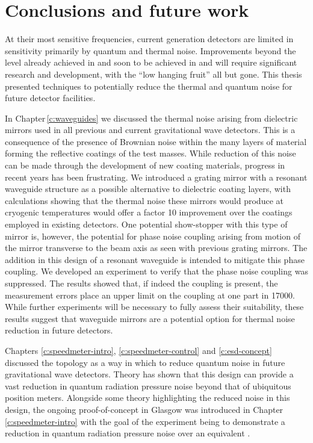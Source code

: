 \chapter{\label{c:conclusion}Conclusions and future work}

At their most sensitive frequencies, current generation detectors are limited in sensitivity primarily by quantum and thermal noise. Improvements beyond the level already achieved in \ALIGO{} and soon to be achieved in \AVIRGO{} and \KAGRA{} will require significant research and development, with the ``low hanging fruit'' all but gone. This thesis presented techniques to potentially reduce the thermal and quantum noise for future detector facilities.

In Chapter\,\ref{c:waveguides} we discussed the thermal noise arising from dielectric mirrors used in all previous and current gravitational wave detectors. This is a consequence of the presence of Brownian noise within the many layers of material forming the reflective coatings of the test masses. While reduction of this noise can be made through the development of new coating materials, progress in recent years has been frustrating. We introduced a grating mirror with a resonant waveguide structure as a possible alternative to dielectric coating layers, with calculations showing that the thermal noise these mirrors would produce at cryogenic temperatures would offer a factor \num{10} improvement over the coatings employed in existing detectors. One potential show-stopper with this type of mirror is, however, the potential for phase noise coupling arising from motion of the mirror transverse to the beam axis as seen with previous grating mirrors. The addition in this design of a resonant waveguide is intended to mitigate this phase coupling. We developed an experiment to verify that the phase noise coupling was suppressed. The results showed that, if indeed the coupling is present, the measurement errors place an upper limit on the coupling at one part in \num{17000}. While further experiments will be necessary to fully assess their suitability, these results suggest that waveguide mirrors are a potential option for thermal noise reduction in future detectors.

Chapters \ref{c:speedmeter-intro}, \ref{c:speedmeter-control} and \ref{c:esd-concept} discussed the \emph{\SM{}} topology as a way in which to reduce quantum noise in future gravitational wave detectors. Theory has shown that this design can provide a vast reduction in quantum radiation pressure noise beyond that of ubiquitous position meters. Alongside some theory highlighting the reduced noise in this design, the ongoing proof-of-concept \SSMEXPT{} in Glasgow was introduced in Chapter\,\ref{c:speedmeter-intro} with the goal of the experiment being to demonstrate a reduction in quantum radiation pressure noise over an equivalent \MI{}.

